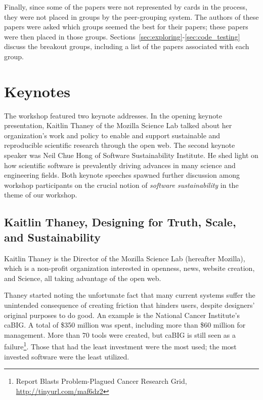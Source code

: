 \documentclass[11pt, oneside]{amsart}
\newcommand{\note}[1]{ {\textcolor{blueish}    { ***Note:      #1 }}}
\begin{document}
Finally, since some of the papers were not represented by cards in the process,
they were not placed in groups by the peer-grouping system. The authors of
these papers were asked which groups seemed the best for their papers; these
papers were then placed in those groups. Sections~\ref{sec:exploring}-\ref{sec:code_testing}
discuss the breakout groups, including a list of the papers associated with each
group.


\section{Keynotes} \label{sec:keynotes}
\begin{comment}
\note{Lead: Choi. \href{http://tinyurl.com/q6ew45v}{Google Notes}.
\href{http://tinyurl.com/mnenzms}{Abstracts and slides}}
\end{comment}

The workshop featured two keynote addresses. In the opening keynote
presentation, Kaitlin Thaney of the Mozilla Science Lab talked about her
organization's work and policy to enable and support sustainable and
reproducible scientific research through the open web. The second keynote
speaker was Neil Chue Hong of Software Sustainability Institute. He shed
light on how scientific software is prevalently driving advances in many science
and engineering fields. Both keynote speeches spawned further discussion among
workshop participants on the crucial notion of \emph{software sustainability}
in the theme of our workshop.

\subsection{Kaitlin Thaney, Designing for Truth, Scale, and Sustainability~\cite{Thaney_slides}}
\label{keynote1}

Kaitlin Thaney is the Director of the Mozilla Science Lab (hereafter Mozilla), which
is a non-profit organization interested in openness, news, website
creation, and Science, all taking advantage of the open web.

Thaney started noting the unfortunate fact that many current systems suffer the
unintended consequence of creating friction that hinders users, despite
designers' original purposes to do good. An example is the National Cancer
Institute's caBIG. A total of \$350 million was spent, including more than \$60
million for management. More than $70$ tools were created, but caBIG is still
seen as a failure\footnote{Report Blasts Problem-Plagued Cancer Research Grid,
\url{http://tinyurl.com/maf6dz2}}. Those that had the least investment were the
most used; the most invested software were the least utilized.
\end{document}
